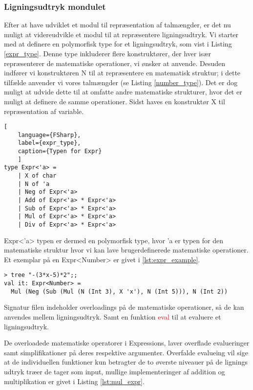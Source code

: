 \documentclass{article}
\begin{document}
\subsubsection{Ligningsudtryk mondulet} \label{sec:expression_module}
Efter at have udviklet et modul til repræsentation af talmængder, er det nu muligt at videreudvikle et modul til at repræsentere ligningsudtryk. Vi starter med at definere en polymorfisk type for et ligningsudtryk, som vist i Listing \ref{expr_type}. Denne type inkluderer flere konstruktører, der hver især repræsenterer de matematiske operationer, vi ønsker at anvende. Desuden indfører vi konstruktøren N til at repræsentere en matematisk struktur; i dette tilfælde anvender vi vores talmængder (se Listing \ref{number_type}). Det er dog muligt at udvide dette til at omfatte andre matematiske strukturer, hvor det er muligt at definere de samme operationer. Sidst haves en konstruktør X til repræsentation af variable.

\begin{lstlisting}[
    language={FSharp}, 
    label={expr_type}, 
    caption={Typen for Expr}
    ]
type Expr<'a> = 
    | X of char
    | N of 'a
    | Neg of Expr<'a>
    | Add of Expr<'a> * Expr<'a>
    | Sub of Expr<'a> * Expr<'a>
    | Mul of Expr<'a> * Expr<'a>
    | Div of Expr<'a> * Expr<'a>
\end{lstlisting}

Expr\textless'a\textgreater{}  typen er dermed en polymorfisk type, hvor 'a er typen for den matematiske struktur hvor vi kan lave brugerdefinerede matematiske operationer. Et exemplar på en Expr\textless Number\textgreater{}  er givet i \ref{lst:expr_example}. 

\begin{lstlisting}[style=output, label={lst:expr_example}, caption={$-(3 \cdot x - 5) \cdot 2$ som et udtryks træ. Funktionen tree bliver beskrevet i \ref{sec:expression_generation}.}]
> tree "-(3*x-5)*2";;
val it: Expr<Number> = 
  Mul (Neg (Sub (Mul (N (Int 3), X 'x'), N (Int 5))), N (Int 2))
\end{lstlisting}

Signatur filen indeholder overloadings på de matematiske operationer, så de kan anvendes mellem ligningsudtryk. Samt en funktion \textcolor{red}{eval} til at evaluere et ligningsudtryk. 




De overloadede matematiske operatorer i Expressions, laver overflade evalueringer samt simplifikationer på deres respektive argumenter. Overfalde evalueing vil sige at de individuellen funktioner kun betragter de to øverste niveauer på de lignings udtryk træer de tager som input, mullige implementeringer af addition og multiplikation er givet i Listing \ref{lst:mul_expr}. 
\end{document}
